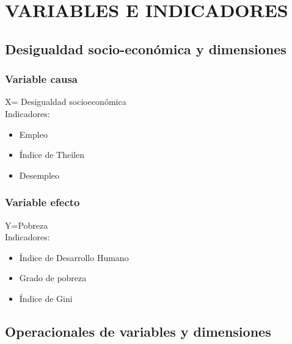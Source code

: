 \section{VARIABLES E INDICADORES}

\subsection{Desigualdad socio-económica y dimensiones}

\subsubsection{Variable causa}

X= Desigualdad socioeconómica \\
Indicadores:
\begin{itemize}
\item Empleo
\item Índice de Theilen
\item Desempleo
\end{itemize}


\subsubsection{Variable efecto}

Y=Pobreza \\
Indicadores:
\begin{itemize}
\item Índice de Desarrollo Humano
\item Grado de pobreza
\item Índice de Gini
\end{itemize}

	
\subsection{Operacionales de variables y dimensiones}


		
